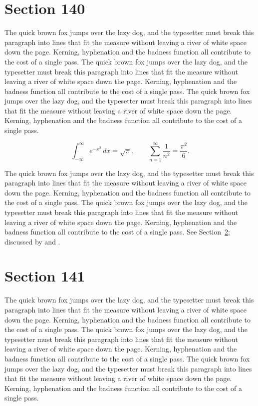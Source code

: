 \documentclass{article}
\begin{document}
\section{Section 140}
\label{sec:140}
The quick brown fox jumps over the lazy dog, and the typesetter must break this paragraph into lines that fit the measure without leaving a river of white space down the page. Kerning, hyphenation and the badness function all contribute to the cost of a single pass. The quick brown fox jumps over the lazy dog, and the typesetter must break this paragraph into lines that fit the measure without leaving a river of white space down the page. Kerning, hyphenation and the badness function all contribute to the cost of a single pass. The quick brown fox jumps over the lazy dog, and the typesetter must break this paragraph into lines that fit the measure without leaving a river of white space down the page. Kerning, hyphenation and the badness function all contribute to the cost of a single pass. 

\begin{equation}\label{eq:140}
\int_{-\infty}^{\infty} e^{-x^{2}}\,dx = \sqrt{\pi}, \qquad
\sum_{n=1}^{\infty} \frac{1}{n^{2}} = \frac{\pi^{2}}{6}.
\end{equation}

The quick brown fox jumps over the lazy dog, and the typesetter must break this paragraph into lines that fit the measure without leaving a river of white space down the page. Kerning, hyphenation and the badness function all contribute to the cost of a single pass. The quick brown fox jumps over the lazy dog, and the typesetter must break this paragraph into lines that fit the measure without leaving a river of white space down the page. Kerning, hyphenation and the badness function all contribute to the cost of a single pass. 
See Section~\ref{sec:141}; discussed by \textcite{k1} and \textcite{l3}.
\section{Section 141}
\label{sec:141}
The quick brown fox jumps over the lazy dog, and the typesetter must break this paragraph into lines that fit the measure without leaving a river of white space down the page. Kerning, hyphenation and the badness function all contribute to the cost of a single pass. The quick brown fox jumps over the lazy dog, and the typesetter must break this paragraph into lines that fit the measure without leaving a river of white space down the page. Kerning, hyphenation and the badness function all contribute to the cost of a single pass. The quick brown fox jumps over the lazy dog, and the typesetter must break this paragraph into lines that fit the measure without leaving a river of white space down the page. Kerning, hyphenation and the badness function all contribute to the cost of a single pass. 
\end{document}
